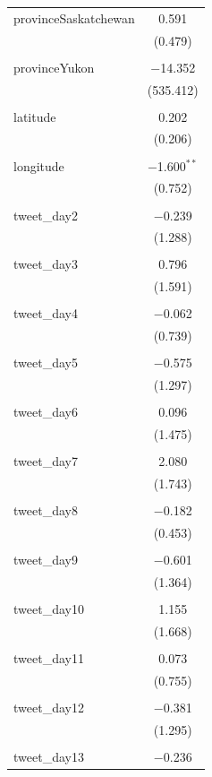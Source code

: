 \documentclass{article}
\begin{document}
\begin{longtable}{@{\extracolsep{10pt}}lc}
 provinceSaskatchewan & 0.591 \\ 
  & (0.479) \\ 
  & \\ 
 provinceYukon & $-$14.352 \\ 
  & (535.412) \\ 
  & \\ 
 latitude & 0.202 \\ 
  & (0.206) \\ 
  & \\ 
 longitude & $-$1.600$^{**}$ \\ 
  & (0.752) \\ 
  & \\ 
 tweet\_day2 & $-$0.239 \\ 
  & (1.288) \\ 
  & \\ 
 tweet\_day3 & 0.796 \\ 
  & (1.591) \\ 
  & \\ 
 tweet\_day4 & $-$0.062 \\ 
  & (0.739) \\ 
  & \\ 
 tweet\_day5 & $-$0.575 \\ 
  & (1.297) \\ 
  & \\ 
 tweet\_day6 & 0.096 \\ 
  & (1.475) \\ 
  & \\ 
 tweet\_day7 & 2.080 \\ 
  & (1.743) \\ 
  & \\ 
 tweet\_day8 & $-$0.182 \\ 
  & (0.453) \\ 
  & \\ 
 tweet\_day9 & $-$0.601 \\ 
  & (1.364) \\ 
  & \\ 
 tweet\_day10 & 1.155 \\ 
  & (1.668) \\ 
  & \\ 
 tweet\_day11 & 0.073 \\ 
  & (0.755) \\ 
  & \\ 
 tweet\_day12 & $-$0.381 \\ 
  & (1.295) \\ 
  & \\ 
 tweet\_day13 & $-$0.236 \\ 

\end{longtable}
\end{document}

